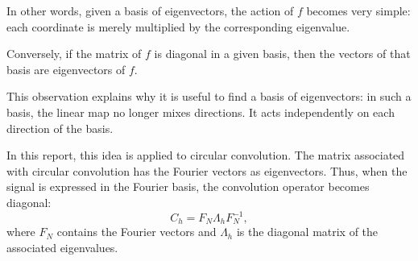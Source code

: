 In other words, given a basis of eigenvectors, the action of $f$ becomes very simple:
each coordinate is merely multiplied by the corresponding eigenvalue.

Conversely, if the matrix of $f$ is diagonal in a given basis, then the vectors of that
basis are eigenvectors of $f$.

This observation explains why it is useful to find a basis of eigenvectors: in such a basis,
the linear map no longer mixes directions. It acts independently on each direction
of the basis.

In this report, this idea is applied to circular convolution. The matrix associated
with circular convolution has the Fourier vectors as eigenvectors. Thus, when
the signal is expressed in the Fourier basis, the convolution operator becomes diagonal:
\[
C_h = F_N \Lambda_h F_N^{-1},
\]
where $F_N$ contains the Fourier vectors and $\Lambda_h$ is the diagonal matrix of the
associated eigenvalues.
